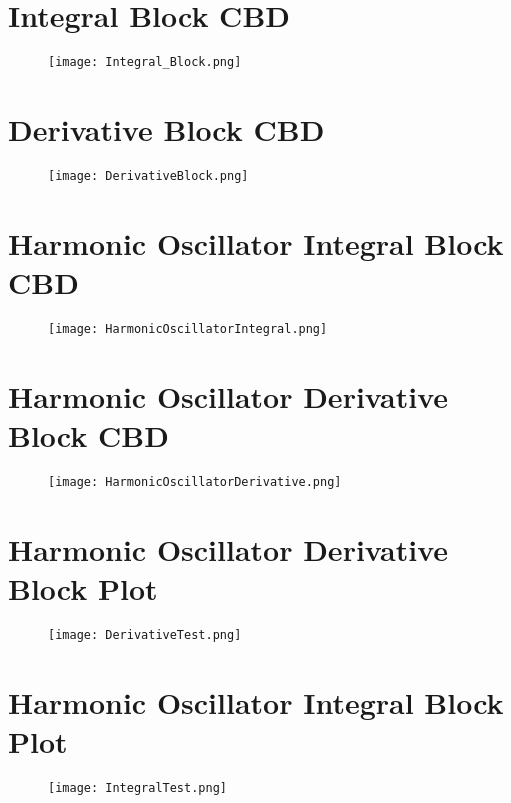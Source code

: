\documentclass{article}
\begin{document}
\begin{appendices}
\section{Integral Block CBD}
\label{appendix:euler}
\begin{figure}[!ht]
  \centering
  \texttt{[image: Integral\_Block.png]}  
\end{figure}
\newpage
\section{Derivative Block CBD}
\label{appendix:derivative}
\begin{figure}[!ht]
  \centering
  \texttt{[image: DerivativeBlock.png]}  
\end{figure}
\newpage
\section{Harmonic Oscillator Integral Block CBD}
\label{appendix:hointegral}
\begin{figure}[!ht]
  \centering
  \texttt{[image: HarmonicOscillatorIntegral.png]}  
\end{figure}

\section{Harmonic Oscillator Derivative Block CBD}
\label{appendix:hoderivative}
\begin{figure}[!ht]
  \centering
  \texttt{[image: HarmonicOscillatorDerivative.png]}  
\end{figure}

\newpage
\section{Harmonic Oscillator Derivative Block Plot}
\label{appendix:hoderivativeplot}
\begin{figure}[!ht]
  \centering
  \texttt{[image: DerivativeTest.png]}  
\end{figure}

\section{Harmonic Oscillator Integral Block Plot}
\label{appendix:hointegralplot}
\begin{figure}[!ht]
  \centering
  \texttt{[image: IntegralTest.png]}  
\end{figure}
\newpage


\end{appendices}
\end{document}
